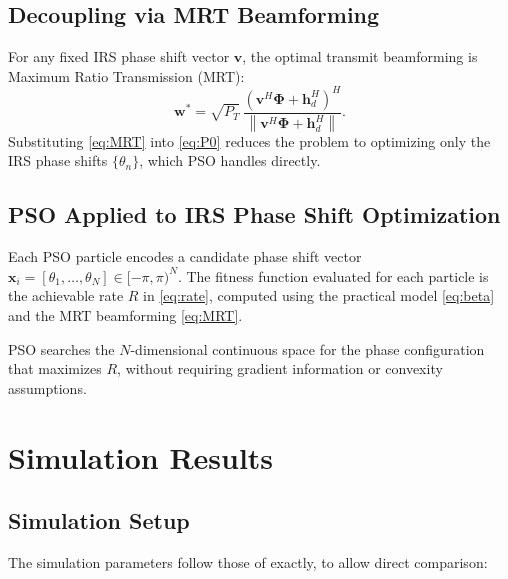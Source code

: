 \documentclass[12pt, a4paper]{article}
\newcommand{\vect}[1]{\mathbf{#1}}          %
\newcommand{\norm}[1]{\left\|#1\right\|}    %
\begin{document}
\subsection{Decoupling via MRT Beamforming}
For any fixed IRS phase shift vector $\vect{v}$, the optimal transmit
beamforming is Maximum Ratio Transmission (MRT):
\begin{equation}
    \vect{w}^* = \sqrt{P_T}\,
        \frac{\left(\vect{v}^H\boldsymbol{\Phi} + \vect{h}_d^H\right)^H}
             {\norm{\vect{v}^H\boldsymbol{\Phi} + \vect{h}_d^H}}.
    \label{eq:MRT}
\end{equation}
Substituting \eqref{eq:MRT} into \eqref{eq:P0} reduces the problem to
optimizing only the IRS phase shifts $\{\theta_n\}$, which PSO handles directly.

\subsection{PSO Applied to IRS Phase Shift Optimization}
Each PSO particle encodes a candidate phase shift vector
$\vect{x}_i = [\theta_1, \ldots, \theta_N] \in [-\pi, \pi)^N$.
The fitness function evaluated for each particle is the achievable rate
$R$ in \eqref{eq:rate}, computed using the practical model \eqref{eq:beta}
and the MRT beamforming \eqref{eq:MRT}.

PSO searches the $N$-dimensional continuous space for the phase configuration
that maximizes $R$, without requiring gradient information or convexity
assumptions.

\section{Simulation Results}
\label{sec:results}

\subsection{Simulation Setup}
The simulation parameters follow those of \cite{abeywickrama2020} exactly,
to allow direct comparison:
\end{document}
